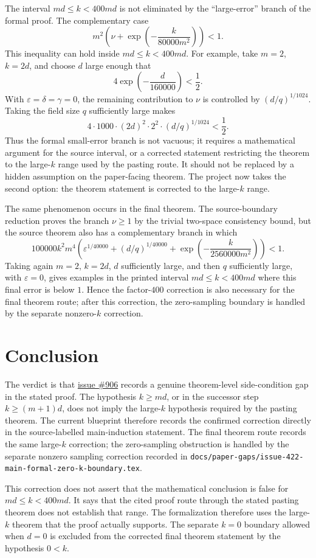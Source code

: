 \documentclass[11pt]{article}
\begin{document}
The interval \(md\le k<400md\) is not eliminated by the ``large-error'' branch
of the formal proof.  The complementary case
\[
  m^2\left(\nu+\exp\!\left(-\frac{k}{80000m^2}\right)\right) < 1.
\]
This inequality can hold inside \(md\le k<400md\).  For example, take
\(m=2\), \(k=2d\), and choose \(d\) large enough that
\[
  4\exp\!\left(-\frac{d}{160000}\right)<\frac12.
\]
With \(\varepsilon=\delta=\gamma=0\), the remaining contribution to \(\nu\) is
controlled by \((d/q)^{1/1024}\).  Taking the field size \(q\) sufficiently
large makes
\[
  4\cdot 1000\cdot (2d)^2\cdot 2^2\cdot (d/q)^{1/1024}<\frac12.
\]
Thus the formal small-error branch is not vacuous; it requires a mathematical
argument for the source interval, or a corrected statement restricting the
theorem to the large-\(k\) range used by the pasting route.  It should not be
replaced by a hidden assumption on the paper-facing theorem.  The project now
takes the second option: the theorem statement is corrected to the large-\(k\)
range.

The same phenomenon occurs in the final theorem.  The source-boundary reduction
 proves the branch
\(\nu\ge 1\) by the trivial two-space consistency bound, but the source theorem
also has a complementary branch in which
\[
  100000 k^2m^4\left(\varepsilon^{1/40000}
    +(d/q)^{1/40000}
    +\exp\!\left(-\frac{k}{2560000m^2}\right)\right)<1.
\]
Taking again \(m=2\), \(k=2d\), \(d\) sufficiently large, and then \(q\)
sufficiently large, with \(\varepsilon=0\), gives examples in the printed
interval \(md\le k<400md\) where this final error is below \(1\).  Hence the
factor-\(400\) correction is also necessary for the final theorem route; after
this correction, the zero-sampling boundary is handled by the separate
nonzero-\(k\) correction.

\section{Conclusion}

The verdict is that
\href{https://github.com/LionSR/MIPStarRE/issues/906}{issue \#906} records a
genuine theorem-level side-condition gap in the stated proof.  The hypothesis
\(k\ge md\), or in the successor step \(k\ge (m+1)d\), does not imply the
large-\(k\) hypothesis required by the pasting theorem.  The current blueprint
therefore records the confirmed correction directly in the source-labelled
main-induction statement.  The final theorem route records the same large-\(k\)
correction; the zero-sampling obstruction is handled by the separate nonzero
sampling correction recorded in
\texttt{docs/paper-gaps/issue-422-main-formal-zero-k-boundary.tex}.

This correction does not assert that the mathematical conclusion is false for
\(md\le k<400md\).  It says that the cited proof route through the stated
pasting theorem does not establish that range.  The formalization therefore
uses the large-\(k\) theorem that the proof actually supports.  The separate
\(k=0\) boundary allowed when \(d=0\) is excluded from the corrected final
theorem statement by the hypothesis \(0<k\).



\end{document}

